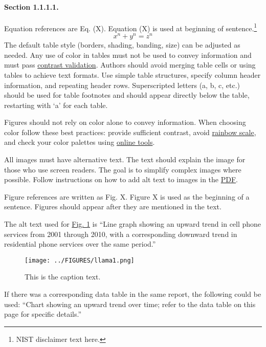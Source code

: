 \paragraph{Section 1.1.1.1.}
Equation references are Eq. (X). Equation (X) is used at beginning of sentence.\footnote{NIST disclaimer text here.} %
\begin{equation}
\label{eq:example}
{x}^{n} + {y}^{n} = {z}^{n}
\end{equation}
The default table style (borders, shading, banding, size) can be adjusted as needed. Any use of color in tables must not be used to convey information and must pass \href{https://support.microsoft.com/en-us/office/make-your-content-accessible-to-everyone-with-the-accessibility-checker-38059c2d-45ef-4830-9797-618f0e96f3ab}{contrast validation}. Authors should avoid merging table cells or using tables to achieve text formats. Use simple table structures, specify column header information, and repeating header rows. Superscripted letters (a, b, c, etc.) should be used for table footnotes and should appear directly below the table, restarting with ‘a’ for each table.

Figures should not rely on color alone to convey information. When choosing color follow these best practices: provide sufficient contrast, avoid \href{https://www.nature.com/articles/519291d}{rainbow scale}, and check your color palettes using \href{http://selection.datavisualization.ch/}{online tools}.

All images must have alternative text. The text should explain the image for those who use screen readers. The goal is to simplify complex images where possible. Follow instructions on how to add alt text to images in the \href{https://helpx.adobe.com/acrobat/using/editing-document-structure-content-tags.html#add_alternate_text_and_supplementary_information_to_tags}{PDF}.

Figure references are written as Fig. X. Figure X is used as the beginning of a sentence. Figures should appear after they are mentioned in the text. 

The alt text used for \href{https://equidox.co/blog/beyond-basic-alt-text-charts-maps-and-diagrams/}{Fig. 1} is “Line graph showing an upward trend in cell phone services from 2001 through 2010, with a corresponding downward trend in residential phone services over the same period.” 
\begin{figure}[h] 
	\centering 	\texttt{[image: ../FIGURES/llama1.png]}
	\caption{This is the caption text.}
	\label{fig:llama}
\end{figure}

If there was a corresponding data table in the same report, the following could be used: “Chart showing an upward trend over time; refer to the data table on this page for specific details.”
